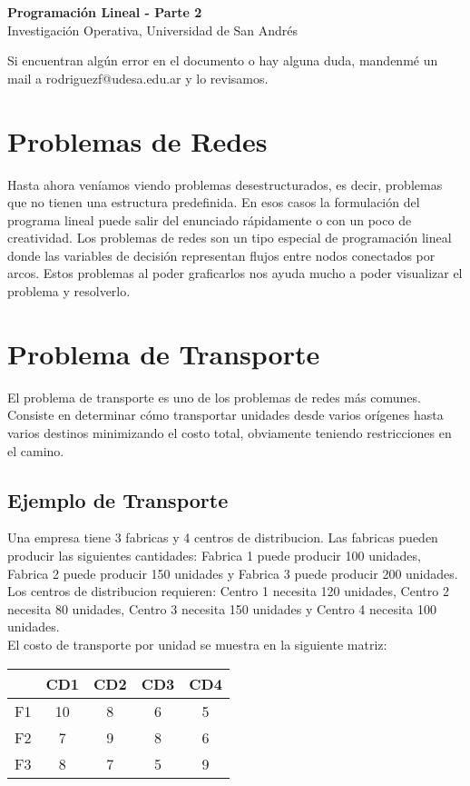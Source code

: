 \documentclass[12pt]{article}
\begin{document}
\begin{center}
  {\LARGE \textbf{Programación Lineal - Parte 2}}\\[0.5em]
  {Investigación Operativa, Universidad de San Andrés}
\end{center}

Si encuentran algún error en el documento o hay alguna duda, mandenmé un mail a rodriguezf@udesa.edu.ar y lo revisamos.

\section*{Problemas de Redes}

Hasta ahora veníamos viendo problemas desestructurados, es decir, problemas que no tienen una estructura predefinida. En esos casos la formulación del programa lineal puede salir del enunciado rápidamente o con un poco de creatividad. Los problemas de redes son un tipo especial de programación lineal donde las variables de decisión representan flujos entre nodos conectados por arcos. Estos problemas al poder graficarlos nos ayuda mucho a poder visualizar el problema y resolverlo.

\section{Problema de Transporte}

El problema de transporte es uno de los problemas de redes más comunes. Consiste en determinar cómo transportar unidades desde varios orígenes hasta varios destinos minimizando el costo total, obviamente teniendo restricciones en el camino.

\subsection{Ejemplo de Transporte}

Una empresa tiene 3 fabricas y 4 centros de distribucion. Las fabricas pueden producir las siguientes cantidades: Fabrica 1 puede producir 100 unidades, Fabrica 2 puede producir 150 unidades y Fabrica 3 puede producir 200 unidades. Los centros de distribucion requieren: Centro 1 necesita 120 unidades, Centro 2 necesita 80 unidades, Centro 3 necesita 150 unidades y Centro 4 necesita 100 unidades. \\

El costo de transporte por unidad se muestra en la siguiente matriz:

\begin{table}[H]
    \centering
    \begin{tabular}{c|cccc}
        \toprule
        & CD1 & CD2 & CD3 & CD4 \\
        \midrule
        F1 & 10 & 8 & 6 & 5 \\
        F2 & 7 & 9 & 8 & 6 \\
        F3 & 8 & 7 & 5 & 9 \\
        \bottomrule
    \end{tabular}
\end{table}
\end{document}
